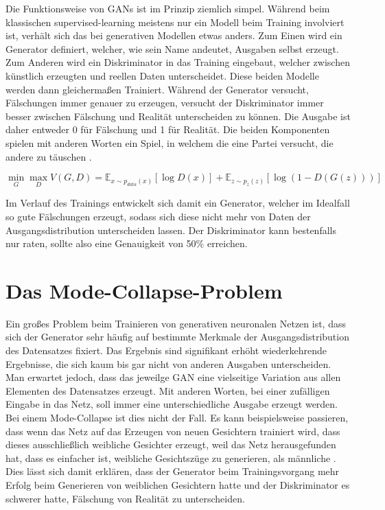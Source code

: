\documentclass{hsflensburg}
\begin{document}
  Die Funktionsweise von GANs ist im Prinzip ziemlich simpel. Während beim
  klassischen supervised-learning meistens nur ein Modell beim Training
  involviert ist, verhält sich das bei generativen Modellen etwas anders. Zum
  Einen wird ein Generator definiert, welcher, wie sein Name andeutet, Ausgaben
  selbst erzeugt. Zum Anderen wird ein Diskriminator in das Training eingebaut,
  welcher zwischen künstlich erzeugten und reellen Daten unterscheidet. Diese
  beiden Modelle werden dann gleichermaßen Trainiert. Während der Generator
  versucht, Fälschungen immer genauer zu erzeugen, versucht der Diskriminator
  immer besser zwischen Fälschung und Realität unterscheiden zu können. Die
  Ausgabe ist daher entweder 0 für Fälschung und 1 für Realität. Die beiden
  Komponenten spielen mit anderen Worten ein Spiel, in welchem die eine Partei
  versucht, die andere zu täuschen \cite{goodfellow2014generative}.

  \[
    \min_G \max_D V(G, D) = \mathbb{E}_{x \sim p_{data}(x)}\left[ \log D(x) \right] + \mathbb{E}_{z \sim p_z(z)}\left[ \log (1 - D(G(z))) \right]
  \]

  Im Verlauf des Trainings entwickelt sich damit ein Generator, welcher im
  Idealfall so gute Fälschungen erzeugt, sodass sich diese nicht mehr von Daten
  der Ausgangsdistribution unterscheiden lassen.  Der Diskriminator kann
  bestenfalls nur raten, sollte also eine Genauigkeit von 50\% erreichen.
  
  \section{Das Mode-Collapse-Problem}
  Ein großes Problem beim Trainieren von generativen neuronalen Netzen ist, dass
  sich der Generator sehr häufig auf bestimmte Merkmale der Ausgangsdistribution
  des Datensatzes fixiert. Das Ergebnis sind signifikant erhöht wiederkehrende
  Ergebnisse, die sich kaum bis gar nicht von anderen Ausgaben unterscheiden.
  Man erwartet jedoch, dass das jeweilge GAN eine vielseitige Variation aus
  allen Elementen des Datensatzes erzeugt. Mit anderen Worten, bei einer
  zufälligen Eingabe in das Netz, soll immer eine unterschiedliche Ausgabe
  erzeugt werden. Bei einem Mode-Collapse ist dies nicht der Fall. Es kann
  beispielsweise passieren, dass wenn das Netz auf das Erzeugen von neuen
  Gesichtern trainiert wird, dass dieses ausschließlich weibliche Gesichter
  erzeugt, weil das Netz herausgefunden hat, dass es einfacher ist, weibliche
  Gesichtszüge zu generieren, als männliche \cite{richardson2018gans}. Dies
  lässt sich damit erklären, dass der Generator beim Trainingsvorgang mehr
  Erfolg beim Generieren von weiblichen Gesichtern hatte und der Diskriminator
  es schwerer hatte, Fälschung von Realität zu unterscheiden.
\end{document}
